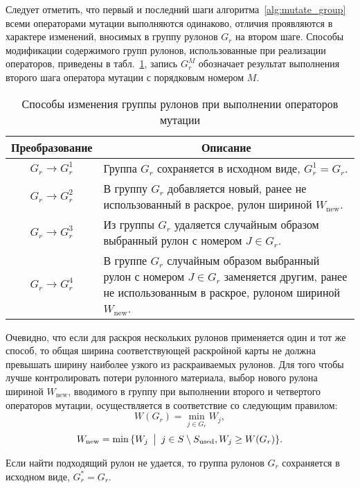 \documentclass[12pt]{article}
\newcommand\tablecaption[1]{
    \captionsetup{labelsep=newline,justification=centering}
    \caption{#1}
}
\begin{document}
Следует отметить, что первый и последний шаги алгоритма~\ref{alg:mutate_group} 
всеми операторами мутации выполняются одинаково, отличия проявляются в характере 
изменений, вносимых в группу рулонов $G_r$ на втором шаге. Способы модификации 
содержимого групп рулонов, использованные при реализации операторов, приведены 
в табл.~\ref{tab:mutation}, 
запись $G_r^M$ обозначает результат выполнения второго шага 
оператора мутации с порядковым номером $M$.
\begin{table}[ht]
    \centering
    \tablecaption{Способы изменения группы рулонов при выполнении операторов 
        мутации}
    \label{tab:mutation}    
    \begin{tabular}{|c|p{}|}
        \hline Преобразование & \multicolumn{1}{c|}{Описание} \\ \hline
        $G_r \rightarrow G_r^1$ & 
            Группа $G_r$ сохраняется в исходном виде, $G_r^1=G_r$. \\ \hline
        $G_r \rightarrow G_r^2$ & 
            В группу $G_r$ добавляется новый, ранее не использованный в 
            раскрое, рулон шириной $W_{\text{new}}$. \\ \hline
        $G_r \rightarrow G_r^3$ & 
            Из группы $G_r$ удаляется случайным образом выбранный рулон с 
            номером $J \in G_r$. \\ \hline
        $G_r \rightarrow G_r^4$ &
             В группе $G_r$ случайным образом выбранный рулон с номером 
             $J \in G_r$ заменяется другим, ранее не использованным в раскрое, 
             рулоном шириной $W_{\text{new}}$. \\ \hline
    \end{tabular}    
\end{table}

Очевидно, что если для раскроя нескольких рулонов применяется один и тот же 
способ, то общая ширина соответствующей раскройной карты не должна превышать 
ширину наиболее узкого из раскраиваемых рулонов. Для того чтобы лучше 
контролировать потери рулонного материала, выбор нового рулона шириной 
$W_{\text{new}}$, вводимого в группу при выполнении второго и четвертого 
операторов мутации, осуществляется в соответствие со следующим правилом:
\[W(G_r)=\min_{j \in G_r}{W_j},\]
\[W_{\text{new}}=\min{\{ W_j \: \bigm| \: j \in S \setminus S_{\text{used}}, W_j \geq W(G_r) \}}.\]

Если найти подходящий рулон не удается, то группа рулонов $G_r$ сохраняется 
в исходном виде, $G_r^*=G_r$.
\end{document}
